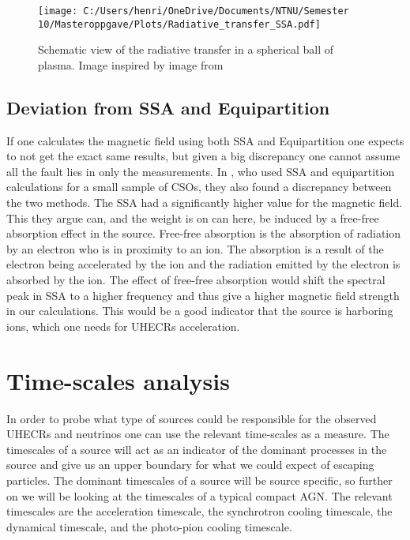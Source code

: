 \begin{figure}
    \centering
    \texttt{[image: C:/Users/henri/OneDrive/Documents/NTNU/Semester 10/Masteroppgave/Plots/Radiative\_transfer\_SSA.pdf]}
    \caption{Schematic view of the radiative transfer in a spherical ball of plasma. Image inspired by image from \cite{Hirotani_2005}}
    \label{fig:Radiative_transfer}
\end{figure}

\subsection{Deviation from SSA and Equipartition}
If one calculates the magnetic field using both SSA and Equipartition one expects to not get the exact same results, but given a big discrepancy one cannot assume all the fault lies in only the measurements. In \cite{10.1093/mnras/stt2217}, who used SSA and equipartition calculations for a small sample of CSOs, they also found a discrepancy between the two methods. The SSA had a significantly higher value for the magnetic field. This they argue can, and the weight is on can here, be induced by a free-free absorption effect in the source. Free-free absorption is the absorption of radiation by an electron who is in proximity to an ion. The absorption is a result of the electron being accelerated by the ion and the radiation emitted by the electron is absorbed by the ion. The effect of free-free absorption would shift the spectral peak in SSA to a higher frequency and thus give a higher magnetic field strength in our calculations. This would be a good indicator that the source is harboring ions, which one needs for UHECRs acceleration.

\section{Time-scales analysis}
\label{sec:time_scales}

In order to probe what type of sources could be responsible for the observed UHECRs and neutrinos one can use the relevant time-scales as a measure. The timescales of a source will act as an indicator of the dominant processes in the source and give us an upper boundary for what we could expect of escaping particles. The dominant timescales of a source will be source specific, so further on we will be looking at the timescales of a typical compact AGN. The relevant timescales are the acceleration timescale, the synchrotron cooling timescale, the dynamical timescale, and the photo-pion cooling timescale.

